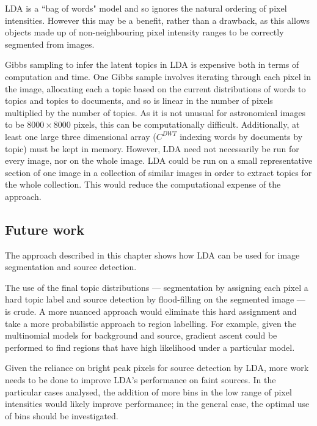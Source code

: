LDA is a ``bag of words" model \cite{blei2011introduction,blei2003latent,steyvers2007probabilistic} and so ignores the natural ordering of pixel intensities. However this may be a benefit, rather than a drawback, as this allows objects made up of non-neighbouring pixel intensity ranges to be correctly segmented from images.

Gibbs sampling to infer the latent topics in LDA is expensive both in terms of computation and time. One Gibbs sample involves iterating through each pixel in the image, allocating each a topic based on the current distributions of words to topics and topics to documents, and so is linear in the number of pixels multiplied by the number of topics. As it is not unusual for astronomical images to be $8000 \times 8000$ pixels, this can be computationally difficult. Additionally, at least one large three dimensional array ($C^{DWT}$ indexing words by documents by topic) must be kept in memory. However, LDA need not necessarily be run for every image, nor on the whole image. LDA could be run on a small representative section of one image in a collection of similar images in order to extract topics for the whole collection. This would reduce the computational expense of the approach.

\subsection{Future work}\label{sec:lda-fw}

The approach described in this chapter shows how LDA can be used for image segmentation and source detection. 

The use of the final topic distributions --- segmentation by assigning each pixel a hard topic label and source detection by flood-filling on the segmented image --- is crude. A more nuanced approach would eliminate this hard assignment and take a more probabilistic approach to region labelling. For example, given the multinomial models for background and source, gradient ascent could be performed to find regions that have high likelihood under a particular model.

Given the reliance on bright peak pixels for source detection by LDA, more work needs to be done to improve LDA's performance on faint sources. In the particular cases analysed, the addition of more bins in the low range of pixel intensities would likely improve performance; in the general case, the optimal use of bins should be investigated.

